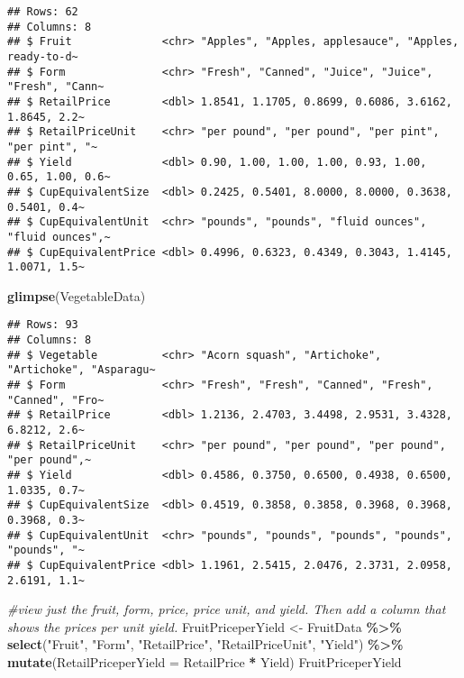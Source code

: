 \documentclass[
]{article}
\newenvironment{Shaded}{\begin{snugshade}}{\end{snugshade}}
\newcommand{\AttributeTok}[1]{\textcolor[rgb]{0.13,0.29,0.53}{#1}}
\newcommand{\CommentTok}[1]{\textcolor[rgb]{0.56,0.35,0.01}{\textit{#1}}}
\newcommand{\FunctionTok}[1]{\textcolor[rgb]{0.13,0.29,0.53}{\textbf{#1}}}
\newcommand{\NormalTok}[1]{#1}
\newcommand{\OtherTok}[1]{\textcolor[rgb]{0.56,0.35,0.01}{#1}}
\newcommand{\SpecialCharTok}[1]{\textcolor[rgb]{0.81,0.36,0.00}{\textbf{#1}}}
\newcommand{\StringTok}[1]{\textcolor[rgb]{0.31,0.60,0.02}{#1}}
\begin{document}
\begin{verbatim}
## Rows: 62
## Columns: 8
## $ Fruit              <chr> "Apples", "Apples, applesauce", "Apples, ready-to-d~
## $ Form               <chr> "Fresh", "Canned", "Juice", "Juice", "Fresh", "Cann~
## $ RetailPrice        <dbl> 1.8541, 1.1705, 0.8699, 0.6086, 3.6162, 1.8645, 2.2~
## $ RetailPriceUnit    <chr> "per pound", "per pound", "per pint", "per pint", "~
## $ Yield              <dbl> 0.90, 1.00, 1.00, 1.00, 0.93, 1.00, 0.65, 1.00, 0.6~
## $ CupEquivalentSize  <dbl> 0.2425, 0.5401, 8.0000, 8.0000, 0.3638, 0.5401, 0.4~
## $ CupEquivalentUnit  <chr> "pounds", "pounds", "fluid ounces", "fluid ounces",~
## $ CupEquivalentPrice <dbl> 0.4996, 0.6323, 0.4349, 0.3043, 1.4145, 1.0071, 1.5~
\end{verbatim}

\begin{Shaded}
\begin{Highlighting}[]
\FunctionTok{glimpse}\NormalTok{(VegetableData)}
\end{Highlighting}
\end{Shaded}

\begin{verbatim}
## Rows: 93
## Columns: 8
## $ Vegetable          <chr> "Acorn squash", "Artichoke", "Artichoke", "Asparagu~
## $ Form               <chr> "Fresh", "Fresh", "Canned", "Fresh", "Canned", "Fro~
## $ RetailPrice        <dbl> 1.2136, 2.4703, 3.4498, 2.9531, 3.4328, 6.8212, 2.6~
## $ RetailPriceUnit    <chr> "per pound", "per pound", "per pound", "per pound",~
## $ Yield              <dbl> 0.4586, 0.3750, 0.6500, 0.4938, 0.6500, 1.0335, 0.7~
## $ CupEquivalentSize  <dbl> 0.4519, 0.3858, 0.3858, 0.3968, 0.3968, 0.3968, 0.3~
## $ CupEquivalentUnit  <chr> "pounds", "pounds", "pounds", "pounds", "pounds", "~
## $ CupEquivalentPrice <dbl> 1.1961, 2.5415, 2.0476, 2.3731, 2.0958, 2.6191, 1.1~
\end{verbatim}

\begin{Shaded}
\begin{Highlighting}[]
\CommentTok{\#view just the fruit, form, price, price unit, and yield. Then add a column that shows the prices per unit yield. }
\NormalTok{FruitPriceperYield }\OtherTok{\textless{}{-}}\NormalTok{ FruitData }\SpecialCharTok{\%\textgreater{}\%} \FunctionTok{select}\NormalTok{(}\StringTok{"Fruit"}\NormalTok{, }\StringTok{"Form"}\NormalTok{, }\StringTok{"RetailPrice"}\NormalTok{, }\StringTok{"RetailPriceUnit"}\NormalTok{, }\StringTok{"Yield"}\NormalTok{) }\SpecialCharTok{\%\textgreater{}\%} \FunctionTok{mutate}\NormalTok{(}\AttributeTok{RetailPriceperYield =}\NormalTok{ RetailPrice }\SpecialCharTok{*}\NormalTok{ Yield)}
\NormalTok{FruitPriceperYield}
\end{Highlighting}
\end{Shaded}
\end{document}
